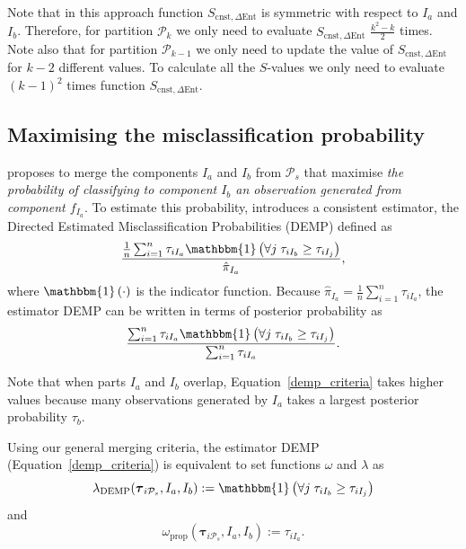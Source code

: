 \documentclass[submit]{smj}
\theoremstyle{definition}
\newcommand{\m}[1]{\boldsymbol{#1}}
\begin{document}
Note that in this approach function $S_{\text{cnst}, \Delta\text{Ent}}$ is symmetric with respect to $I_a$ and $I_b$. Therefore, for partition $\mathcal{P}_k$ we only need to evaluate $S_{\text{cnst}, \Delta\text{Ent}}$ $\frac{k^2-k}{2}$ times. Note also that for partition $\mathcal{P}_{k-1}$ we only need to update the value of $S_{\text{cnst}, \Delta\text{Ent}}$ for $k-2$ different values. To calculate all the $S$-values we only need to evaluate $(k-1)^2$ times function $S_{\text{cnst}, \Delta\text{Ent}}$. 

\subsection{Maximising the misclassification probability}
\label{missclassification_section}

\cite{hennig2010methods} proposes to merge the components $I_a$ and $I_b$ from $ \mathcal{P}_s$ that maximise \emph{the probability of classifying to component $I_b$ an observation generated from component $f_{I_a}$}. To estimate this probability,  \cite{hennig2010methods} introduces a consistent estimator, the Directed Estimated Misclassification Probabilities (DEMP) defined as
\[
\frac{ \frac{1}{n} \sum_{i=1}^n {\tau_{iI_a} \mathbbm{1}\left( \forall j\; \tau_{i I_{b}} \geq \tau_{iI_j} \right)}}{ \hat{\pi}_{I_a}},
\]
where $\mathbbm{1}\left( \cdot \right)$ is the indicator function. Because $ \hat{\pi}_{I_a} = \frac{1}{n} \sum_{i=1}^n \tau_{iI_a}$, the estimator DEMP can be written in terms of posterior probability as
\begin{equation}\label{demp_criteria}
\frac{ \sum_{i=1}^n {\tau_{iI_a} \mathbbm{1}\left( \forall j\; \tau_{i I_{b}} \geq \tau_{iI_j} \right)}}{\sum_{i=1}^n \tau_{iI_a} }.
\end{equation}

Note that when parts $I_a$ and $I_b$ overlap, Equation~\ref{demp_criteria} takes higher values because many observations generated by $I_a$ takes a largest posterior probability $\tau_b$.

Using our general merging criteria, the estimator DEMP (Equation~\ref{demp_criteria}) is equivalent to set functions $\omega$ and $\lambda$ as 
\begin{equation}\label{lambda_demp}
\lambda_{\text{DEMP}}(\m\tau_{i \mathcal{P}_s},  I_a,  I_b) := \mathbbm{1}\left( \forall j\; \tau_{i I_{b}} \geq \tau_{iI_j} \right)
\end{equation}
and
\[
\omega_{\text{prop}}(\m\tau_{i \mathcal{P}_s},  I_a,  I_b) :=  \tau_{iI_a}.
\]
\end{document}
